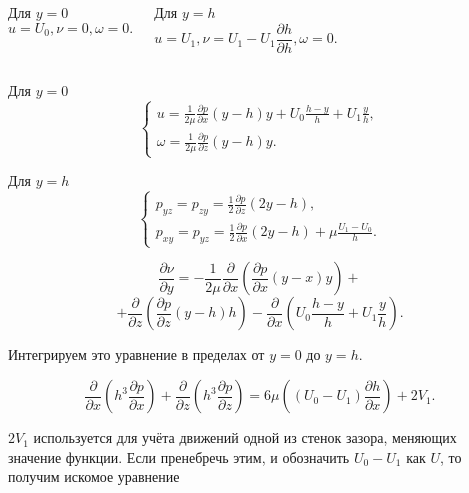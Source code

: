 \documentclass[ignoreonframetext,unicode]{beamer}
\begin{document}
\begin{frame}{}
	
	\begin{columns}
		\begin{block}{Для $y = 0$}
			\[
			u = U_0, \nu = 0, \omega = 0.
			\]
		\end{block}
	
		\begin{block}{Для $y = h$}
		\[
		u = U_1, \nu = U_1 - U_1 \frac{\partial  h}{\partial h}, \omega = 0.
		\]
		\end{block}
	\end{columns}


	\begin{block}{Для $y = 0$}
		\[
		\begin{cases}
			u = \frac{1}{2 \mu} \frac{\partial p}{\partial x} \left( y - h \right) y + U_0 \frac{h - y}{h} + U_1 \frac{y}{h},\\
			\omega = \frac{1}{2 \mu} \frac{\partial p}{\partial z} (y - h) y.
		\end{cases}
		\]
	\end{block}
	

	\begin{block}{Для $y = h$}
		\[
		\begin{cases}
			p_{yz} = p_{zy} = \frac{1}{2} \frac{\partial p}{\partial z} \left( 2y - h \right), \\
			p_{xy} = p_{yz} = \frac{1}{2} \frac{\partial p}{\partial x} \left( 2y - h \right) + \mu \frac{U_1 - U_0}{h}.
		\end{cases}
		\]
	\end{block}


\end{frame}	

\begin{frame}{}
	
	\begin{block}{}
		\[
		\frac{\partial \nu}{\partial y} = - \frac{1}{2 \mu} \frac{\partial}{\partial x} \left( \frac{\partial p}{\partial x} (y - x) y \right) +
		\]
		\[
		+ \frac{\partial}{\partial z} \left( \frac{\partial p}{\partial z} (y - h) h \right) - \frac{\partial}{\partial x} \left( U_0 \frac{h - y}{h} + U_1 \frac{y}{h} \right).
		\]
	\end{block}

Интегрируем это уравнение в пределах от $y = 0$ до $y = h$.
\begin{block}{}
	\[
	\frac{\partial}{\partial x} \left( h^3 \frac{\partial p}{\partial x} \right) + \frac{\partial}{\partial z} \left( h^3 \frac{\partial p}{\partial z} \right) = 6 \mu \left( (U_0 - U_1) \frac{\partial h}{\partial x} \right) + 2 V_1.
	\]
\end{block}
$2 V_1$ используется для учёта движений одной из стенок зазора, меняющих значение функции. Если пренебречь этим, и обозначить $U_0 - U_1$ как $U$, то получим искомое уравнение
	
\end{frame}
\end{document}
